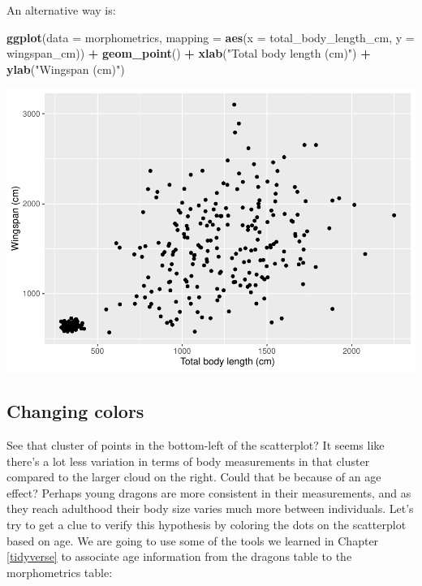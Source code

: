 \documentclass[
]{book}
\newenvironment{Shaded}{\begin{snugshade}}{\end{snugshade}}
\newcommand{\AttributeTok}[1]{\textcolor[rgb]{0.13,0.29,0.53}{#1}}
\newcommand{\FunctionTok}[1]{\textcolor[rgb]{0.13,0.29,0.53}{\textbf{#1}}}
\newcommand{\NormalTok}[1]{#1}
\newcommand{\SpecialCharTok}[1]{\textcolor[rgb]{0.81,0.36,0.00}{\textbf{#1}}}
\newcommand{\StringTok}[1]{\textcolor[rgb]{0.31,0.60,0.02}{#1}}
\begin{document}
An alternative way is:

\begin{Shaded}
\begin{Highlighting}[]
\FunctionTok{ggplot}\NormalTok{(}\AttributeTok{data =}\NormalTok{ morphometrics, }
       \AttributeTok{mapping =} \FunctionTok{aes}\NormalTok{(}\AttributeTok{x =}\NormalTok{ total\_body\_length\_cm, }\AttributeTok{y =}\NormalTok{ wingspan\_cm)) }\SpecialCharTok{+}
  \FunctionTok{geom\_point}\NormalTok{() }\SpecialCharTok{+}
  \FunctionTok{xlab}\NormalTok{(}\StringTok{"Total body length (cm)"}\NormalTok{) }\SpecialCharTok{+}
  \FunctionTok{ylab}\NormalTok{(}\StringTok{"Wingspan (cm)"}\NormalTok{)}
\end{Highlighting}
\end{Shaded}

\includegraphics{reproducible-science_files/figure-latex/gg7-1.pdf}

\hypertarget{changing-colors}{%
\subsection{Changing colors}\label{changing-colors}}

See that cluster of points in the bottom-left of the scatterplot? It seems like
there's a lot less variation in terms of body measurements in that cluster
compared to the larger cloud on the right. Could that be because of an age
effect? Perhaps young dragons are more consistent in their measurements, and as
they reach adulthood their body size varies much more between individuals.
Let's try to get a clue to verify this hypothesis by coloring the dots on the
scatterplot based on age. We are going to use some of the tools we learned in
Chapter \ref{tidyverse} to associate age information from the dragons table
to the morphometrics table:
\end{document}

